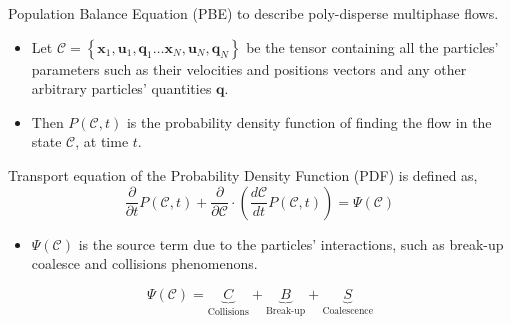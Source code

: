 \documentclass{sintefbeamer}
\newcommand{\pddt}{\frac{\partial}{\partial t}}
\begin{document}
\begin{frame}{Population Balance Equation (PBE) to describe poly-disperse multiphase flows.}
  \begin{definition}
    \begin{itemize}
      \item Let $\mathscr{C} =\left\{\textbf{x}_1,\textbf{u}_1, \textbf{q}_1\ldots\textbf{x}_N,\textbf{u}_N, \textbf{q}_N\right\}$ be the tensor containing all the particles' parameters such as their velocities and positions vectors and any other arbitrary particles' quantities $\textbf{q}$. 
      \item Then $P(\mathscr{C},t)$ is the probability density function of finding the flow in the state $\mathscr{C}$, at time $t$. 
    \end{itemize}
  \end{definition}
  Transport equation of the Probability Density Function (PDF) is defined as,
  \begin{equation*}
    \pddt P(\mathscr{C},t)
    + \frac{\partial}{\partial \mathscr{C}} \cdot
    \left(
        \frac{d\mathscr{C}}{dt}  
        P(\mathscr{C},t)
    \right)
    = \Psi(\mathscr{C})
    \label{eq:dt_P}
\end{equation*}

  \begin{itemize}
    \item $\Psi(\mathscr{C})$ is the source term due to the particles' interactions, such as break-up coalesce and collisions phenomenons. 
  \end{itemize}
  \begin{equation*}
    \Psi(\mathscr{C}) =
    \underbrace{C}_{\text{Collisions}}
    +\underbrace{B}_{\text{Break-up}}
    +\underbrace{S}_{\text{Coalescence}}
  \end{equation*}
\end{frame}
\end{document}
